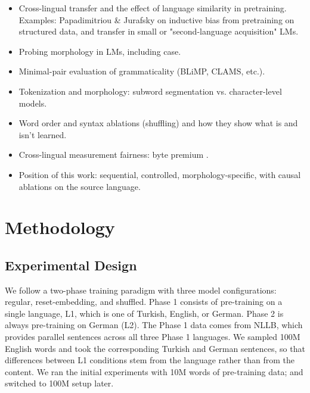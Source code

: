 \documentclass[11pt]{article}
\begin{document}
\begin{itemize}
    \item Cross-lingual transfer and the effect of language similarity in pretraining. Examples: Papadimitriou \& Jurafsky on inductive bias from pretraining on structured data, and transfer in small or "second-language acquisition" LMs.
    \item Probing morphology in LMs, including case.
    \item Minimal-pair evaluation of grammaticality (BLiMP, CLAMS, etc.).
    \item Tokenization and morphology: subword segmentation vs. character-level models.
    \item Word order and syntax ablations (shuffling) and how they show what is and isn't learned.
    \item Cross-lingual measurement fairness: byte premium \citep{arnett2024bitproblemmeasurementdisparities}.
    \item Position of this work: sequential, controlled, morphology-specific, with causal ablations on the source language.
\end{itemize}

\section{Methodology}

\subsection{Experimental Design}

We follow a two-phase training paradigm with three model configurations: regular, reset-embedding, and shuffled. Phase 1 consists of pre-training on a single language, L1, which is one of Turkish, English, or German. Phase 2 is always pre-training on German (L2). The Phase 1 data comes from NLLB, which provides parallel sentences across all three Phase 1 languages. We sampled 100M English words and took the corresponding Turkish and German sentences, so that differences between L1 conditions stem from the language rather than from the content. We ran the initial experiments with 10M words of pre-training data; and switched to 100M setup later.
\end{document}
